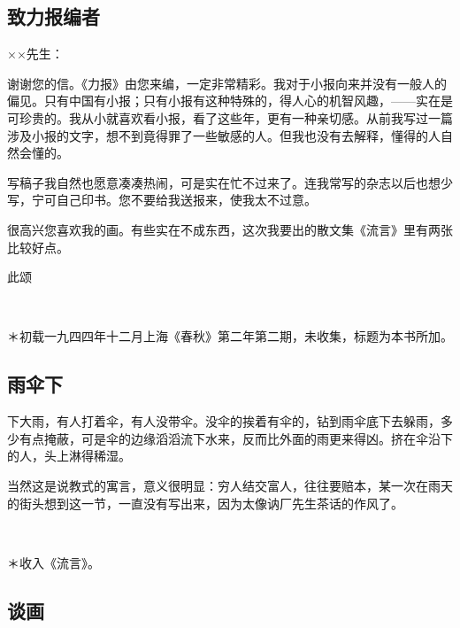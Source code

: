\subsection{致力报编者}

\par ××先生：
\par 谢谢您的信。《力报》由您来编，一定非常精彩。我对于小报向来并没有一般人的偏见。只有中国有小报；只有小报有这种特殊的，得人心的机智风趣，——实在是可珍贵的。我从小就喜欢看小报，看了这些年，更有一种亲切感。从前我写过一篇涉及小报的文字，想不到竟得罪了一些敏感的人。但我也没有去解释，懂得的人自然会懂的。
\par 写稿子我自然也愿意凑凑热闹，可是实在忙不过来了。连我常写的杂志以后也想少写，宁可自己印书。您不要给我送报来，使我太不过意。
\par 很高兴您喜欢我的画。有些实在不成东西，这次我要出的散文集《流言》里有两张比较好点。
\par 此颂
\par {}
\par {}
\par  
\par ＊初载一九四四年十二月上海《春秋》第二年第二期，未收集，标题为本书所加。


\subsection{雨伞下}

\par 下大雨，有人打着伞，有人没带伞。没伞的挨着有伞的，钻到雨伞底下去躲雨，多少有点掩蔽，可是伞的边缘滔滔流下水来，反而比外面的雨更来得凶。挤在伞沿下的人，头上淋得稀湿。
\par 当然这是说教式的寓言，意义很明显：穷人结交富人，往往要赔本，某一次在雨天的街头想到这一节，一直没有写出来，因为太像讷厂先生茶话的作风了。
\par  
\par ＊收入《流言》。


\subsection{谈画}

